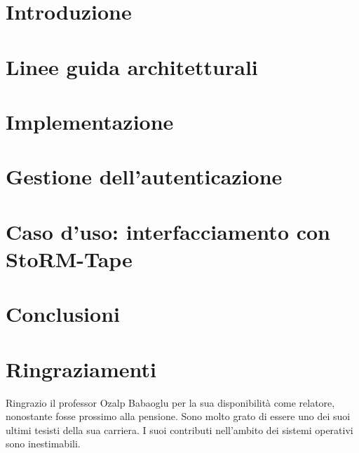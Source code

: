 \documentclass[12pt,a4paper,openright,twoside]{report}
\begin{document}
\chapter{Introduzione}
\lhead[\fancyplain{}{\bfseries\thepage}]{\fancyplain{}{\bfseries\rightmark}}


\chapter{Linee guida architetturali}
\lhead[\fancyplain{}{\bfseries\thepage}]{\fancyplain{}{\bfseries\rightmark}}


\chapter{Implementazione}
\lhead[\fancyplain{}{\bfseries\thepage}]{\fancyplain{}{\bfseries\rightmark}}


\chapter{Gestione dell'autenticazione}
\lhead[\fancyplain{}{\bfseries\thepage}]{\fancyplain{}{\bfseries\rightmark}}


\chapter{Caso d'uso: interfacciamento con StoRM-Tape}
\lhead[\fancyplain{}{\bfseries\thepage}]{\fancyplain{}{\bfseries\rightmark}}


\chapter{Conclusioni}
\lhead[\fancyplain{}{\bfseries\thepage}]{\fancyplain{}{\bfseries\rightmark}}




\chapter*{Ringraziamenti}
Ringrazio il professor Ozalp Babaoglu per la sua disponibilità come relatore, nonostante fosse prossimo alla pensione. 
Sono molto grato di essere uno dei suoi ultimi tesisti della sua carriera. I suoi contributi nell'ambito dei sistemi operativi sono inestimabili.  
\end{document}

